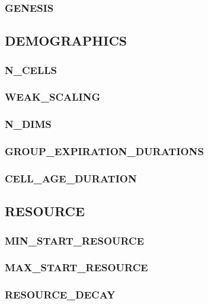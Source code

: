 \subsubsection{GENESIS}


\subsection{DEMOGRAPHICS}


\subsubsection{N\_CELLS}

\subsubsection{WEAK\_SCALING}

\subsubsection{N\_DIMS}

\subsubsection{GROUP\_EXPIRATION\_DURATIONS}

\subsubsection{CELL\_AGE\_DURATION}


\subsection{RESOURCE}


\subsubsection{MIN\_START\_RESOURCE}

\subsubsection{MAX\_START\_RESOURCE}

\subsubsection{RESOURCE\_DECAY}

